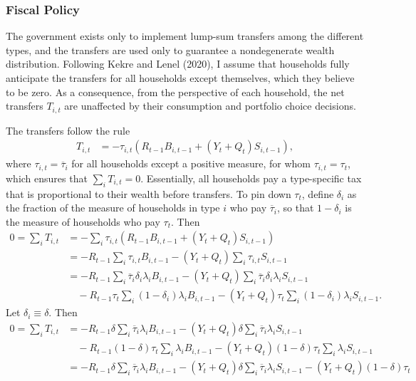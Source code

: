 \documentclass[12 pt, oneside]{article}
\theoremstyle{definition}
\theoremstyle{definition}
\theoremstyle{definition}
\begin{document}
\subsubsection{Fiscal Policy}
The government exists only to implement lump-sum transfers among the different types, and the transfers are used only to guarantee a nondegenerate wealth distribution. Following Kekre and Lenel (2020), I assume that households fully anticipate the transfers for all households except themselves,
which they believe to be zero. As a consequence, from the perspective of each household, the net transfers $T_{i, t}$ are unaffected by their consumption and portfolio choice decisions.

The transfers follow the rule
\begin{align}\label{eq:net transfer rule}
  T_{i, t} & = -\tau_{i, t}(R_{t - 1} B_{i, t - 1} + (Y_t + Q_t)S_{i, t - 1}),
\end{align}
where $\tau_{i, t} = \overline{\tau}_i$ for all households except a positive measure, for whom $\tau_{i, t} = \tau_t$, which ensures that $\sum_i T_{i, t} = 0$.
Essentially, all households pay a type-specific tax that is proportional to their wealth before transfers. To pin down $\tau_t$,
define $\delta_i$ as the fraction of the measure of households in type $i$ who pay $\overline{\tau}_i$, so that $1 - \delta_i$ is the measure of households who pay $\tau_t$. Then
\begin{align*}
 0 = \sum_i T_{i, t} & = -\sum_i \tau_{i, t}(R_{t - 1} B_{i, t - 1} + (Y_t + Q_t)S_{i, t - 1})\\
                  & = -R_{t - 1}\sum_i \tau_{i, t}B_{i, t - 1} - (Y_t + Q_t)\sum_i \tau_{i, t}S_{i, t - 1}\\
                  & = -R_{t - 1}\sum_i \overline{\tau}_i\delta_i \lambda_i B_{i, t - 1} - (Y_t + Q_t)\sum_i \overline{\tau}_i\delta_i\lambda_iS_{i, t - 1}\\
                  & \quad -R_{t - 1}\tau_t\sum_i (1 - \delta_i)\lambda_i B_{i, t - 1} - (Y_t + Q_t)\tau_t\sum_i (1 - \delta_i)\lambda_i S_{i, t - 1}.
\end{align*}
Let $\delta_i \equiv \delta$. Then
\begin{align*}
 0 = \sum_i T_{i, t} & = -R_{t - 1}\delta\sum_i \overline{\tau}_i \lambda_i B_{i, t - 1} - (Y_t + Q_t)\delta\sum_i \overline{\tau}_i\lambda_iS_{i, t - 1}\\
& \quad -R_{t - 1}(1 - \delta)\tau_t\sum_i \lambda_i B_{i, t - 1} - (Y_t + Q_t)(1 - \delta)\tau_t\sum_i \lambda_i S_{i, t - 1}\\
                  & = -R_{t - 1}\delta\sum_i \overline{\tau}_i \lambda_i B_{i, t - 1} - (Y_t + Q_t)\delta\sum_i \overline{\tau}_i\lambda_iS_{i, t - 1}- (Y_t + Q_t)(1 - \delta)\tau_t
\end{align*}
\end{document}
